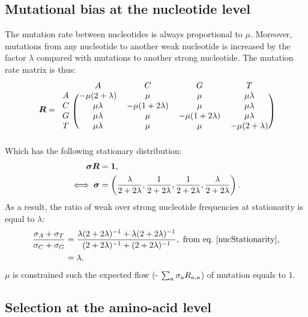 \documentclass{article}
\begin{document}
\subsection{Mutational bias at the nucleotide level}
\label{sec:mut-bias-mut-matrix}
The mutation rate between nucleotides is always proportional to $\mu$.
Moreover, mutations from any nucleotide to another weak nucleotide is increased by the factor $\lambda$ compared with mutations to another strong nucleotide.
The mutation rate matrix is thus:
\begin{equation}
 \label{nucMatrix}
 \Mutmatrix =
 \begin{blockarray}{ccccc}
 & A & C & G & T \\
 \begin{block}{c(cccc)}
 A & {-\mu(2 + \lambda)} & {\mu} & {\mu} & {\mu \lambda} \\
 C & {\mu \lambda} & {-\mu(1 + 2\lambda)} & {\mu} & {\mu \lambda} \\
 G & {\mu \lambda} & {\mu} & {-\mu(1 + 2\lambda)} & {\mu \lambda} \\
 T & {\mu \lambda} & {\mu} & {\mu} & {-\mu(2 + \lambda)} \\
 \end{block}
 \end{blockarray}
\end{equation}
Which has the following stationary distribution:
\begin{align}
 \bm{\sigma} \bm{R} & = \bm{1}, \\
 \iff \bm{\sigma} & = \left( \dfrac{\lambda}{2+2\lambda}, \dfrac{1}{2+2\lambda}, \dfrac{1}{2+2\lambda}, \dfrac{\lambda}{2+2\lambda} \right).
 \label{nucStationarity}
\end{align}
As a result, the ratio of weak over strong nucleotide frequencies at stationarity is equal to $\lambda$:
\begin{align}
 \label{lambda}
 \dfrac{ \mutequi_A + \mutequi_T }{ \mutequi_C + \mutequi_G }
 & = \dfrac{ \lambda ( 2 + 2 \lambda)^{-1} + \lambda ( 2 + 2 \lambda)^{-1}}{ ( 2 + 2 \lambda)^{-1} + ( 2 + 2 \lambda)^{-1}}, \ \text{from eq.~\ref{nucStationarity},}\\
 & = \lambda.
\end{align}
$\mu$ is constrained such the expected flow (- $\sum_{a} \sigma_a R_{a, a} $) of mutation equals to $1$.

\subsection{Selection at the amino-acid level}
\label{sec:mut-bias-aa-selection}
\end{document}
